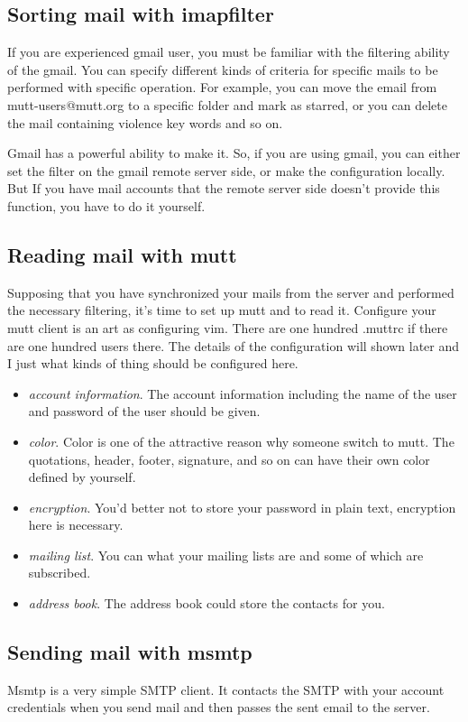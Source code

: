 \documentclass{article}
\begin{document}
\subsection{Sorting mail with imapfilter}
If you are experienced gmail user, you must be familiar with the filtering 
ability of the gmail. You can specify different kinds of criteria for 
specific mails to be performed with specific operation. For example, you can 
move the email from \textsf{mutt-users@mutt.org} to a specific folder and 
mark as starred, or you can delete the mail containing \textsf{violence} key 
words and so on. 


Gmail has a powerful ability to make it. So, if you are using gmail, you can 
either set the filter on the gmail remote server side, or make the 
configuration locally. But If you have mail accounts that the remote server 
side doesn't provide this function, you have to do it yourself.


\subsection{Reading mail with mutt}
Supposing that you have synchronized your mails from the server and 
performed the necessary filtering, it's time to set up mutt and to read it. 
Configure your mutt client is an art as configuring vim. There are one 
hundred .muttrc if there are one hundred users there. The details of the 
configuration will shown later and I just what kinds of thing should be 
configured here. 

\begin{itemize}
  \item \emph{account information}. The account information including the 
    name of the user and password of the user should be given.
  \item \emph{color}. Color is one of the attractive reason why someone 
    switch to mutt. The quotations, header, footer, signature, and so on can 
    have their own color defined by yourself.
  \item \emph{encryption}. You'd better not to store your password in plain 
    text, encryption here is necessary.
  \item \emph{mailing list}. You can what your mailing lists are and some of 
  which are subscribed.
  \item \emph{address book}. The address book could store the contacts for 
    you.
\end{itemize}

\subsection{Sending mail with msmtp}
Msmtp is a very simple SMTP client. It contacts the SMTP with your account 
credentials when you send mail and then passes the sent email to the server.
\end{document}

